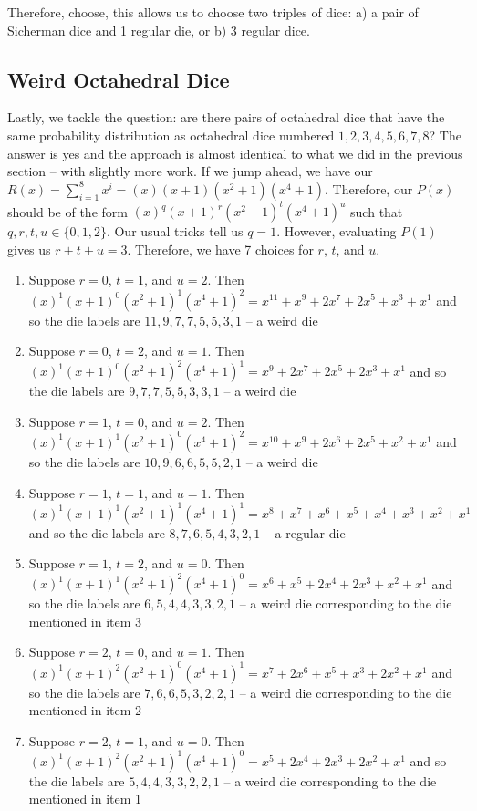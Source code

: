 \documentclass[12pt]{report}
\begin{document}
Therefore, choose, this allows us to choose two triples of dice: 
a) a pair of Sicherman dice and 1 regular die, or 
b) 3 regular dice.

\subsection*{Weird Octahedral Dice}
Lastly, we tackle the question: are there pairs of octahedral dice that have the same probability distribution
as octahedral dice numbered $1,2,3,4,5,6,7,8$? The answer is yes and the approach is almost identical to what
we did in the previous section -- with slightly more work. If we jump ahead, we have our
$R(x)=\sum_{i=1}^{8} x^{i}=(x)(x+1)(x^{2}+1)(x^{4}+1)$. Therefore, our $P(x)$ should be of the form
$(x)^{q}(x+1)^{r}(x^{2}+1)^{t}(x^{4}+1)^{u}$ such that $q,r,t,u \in \{0,1,2\}$. Our usual tricks tell us
$q=1$. However, evaluating $P(1)$ gives us $r+t+u=3$. Therefore, we have 7 choices for $r$, $t$, and $u$.

\begin{enumerate}
\item Suppose $r=0$, $t=1$, and $u=2$. Then $(x)^{1}(x+1)^{0}(x^{2}+1)^{1}(x^{4}+1)^{2}=x^{11}+x^{9}+2x^{7}+2x^{5}+x^{3}+x^{1}$ and so the die labels are $11,9,7,7,5,5,3,1$ -- a weird die
\item Suppose $r=0$, $t=2$, and $u=1$. Then $(x)^{1}(x+1)^{0}(x^{2}+1)^{2}(x^{4}+1)^{1}=x^{9}+2x^{7}+2x^{5}+2x^{3}+x^{1}$ and so the die labels are $9,7,7,5,5,3,3,1$ -- a weird die
\item Suppose $r=1$, $t=0$, and $u=2$. Then $(x)^{1}(x+1)^{1}(x^{2}+1)^{0}(x^{4}+1)^{2}=x^{10}+x^{9}+2x^{6}+2x^{5}+x^{2}+x^{1}$ and so the die labels are $10,9,6,6,5,5,2,1$ -- a weird die
\item Suppose $r=1$, $t=1$, and $u=1$. Then $(x)^{1}(x+1)^{1}(x^{2}+1)^{1}(x^{4}+1)^{1}=x^{8}+x^{7}+x^{6}+x^{5}+x^{4}+x^{3}+x^{2}+x^{1}$ and so the die labels are $8,7,6,5,4,3,2,1$ -- a regular die 
\item Suppose $r=1$, $t=2$, and $u=0$. Then $(x)^{1}(x+1)^{1}(x^{2}+1)^{2}(x^{4}+1)^{0}=x^{6}+x^{5}+2x^{4}+2x^{3}+x^{2}+x^{1}$ and so the die labels are $6,5,4,4,3,3,2,1$ -- a weird die corresponding to the die mentioned in item 3
\item Suppose $r=2$, $t=0$, and $u=1$. Then $(x)^{1}(x+1)^{2}(x^{2}+1)^{0}(x^{4}+1)^{1}=x^{7}+2x^{6}+x^{5}+x^{3}+2x^{2}+x^{1}$ and so the die labels are $7,6,6,5,3,2,2,1$ -- a weird die corresponding to the die mentioned in item 2
\item Suppose $r=2$, $t=1$, and $u=0$. Then $(x)^{1}(x+1)^{2}(x^{2}+1)^{1}(x^{4}+1)^{0}=x^{5}+2x^{4}+2x^{3}+2x^{2}+x^{1}$ and so the die labels are $5,4,4,3,3,2,2,1$ -- a weird die corresponding to the die mentioned in item 1
\end{enumerate}
\end{document}
